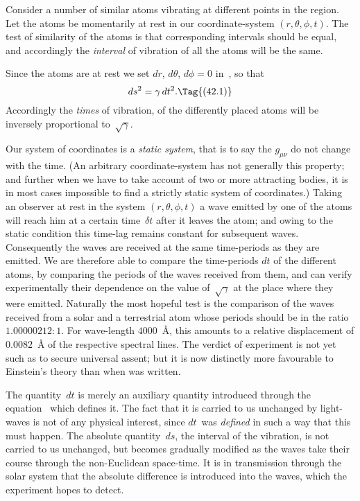 \documentclass[12pt]{book}
\begin{document}
%
%
%
%

Consider a number of similar atoms vibrating at different points in the
region. Let the atoms be momentarily at rest in our coordinate-system
$(r, \theta, \phi, t)$. The test of similarity of the atoms is that corresponding intervals
should be equal, and accordingly the \emph{interval} of vibration of all the atoms will
%
be the same.

Since the atoms are at rest we set $dr$, $d\theta$, $d\phi = 0$ in~, so that
\[
ds^{2} = \gamma\, dt^{2}.
\Tag{(42.1)}
\]
Accordingly the \emph{times} of vibration, of the differently placed atoms will be
inversely proportional to~$\sqrt{\gamma}$.

Our system of coordinates is a \emph{static system}, that is to say the $g_{\mu\nu}$ do not
change with the time. (An arbitrary coordinate-system has not generally this
property; and further when we have to take account of two or more attracting
bodies, it is in most cases impossible to find a strictly static system of coordinates.)
Taking an observer at rest in the system $(r, \theta, \phi, t)$ a wave emitted
by one of the atoms will reach him at a certain time~$\delta t$ after it leaves the
atom; and owing to the static condition this time-lag remains constant for
subsequent waves. Consequently the waves are received at the same time-periods
as they are emitted. We are therefore able to compare the time-periods
$dt$ of the different atoms, by comparing the periods of the waves received from
them, and can verify experimentally their dependence on the value of~$\sqrt{\gamma}$ at
the place where they were emitted. Naturally the most hopeful test is the
comparison of the waves received from a solar and a terrestrial atom whose
periods should be in the ratio $1.00000212 : 1$. For wave-length $4000$~Å, this
amounts to a relative displacement of $0.0082$~Å of the respective spectral
lines. The verdict of experiment is not yet such as to secure universal assent;
but it is now distinctly more favourable to Einstein's theory than when  was written.

The quantity~$dt$ is merely an auxiliary quantity introduced through the
equation~ which defines it. The fact that it is carried to us unchanged
by light-waves is not of any physical interest, since $dt$~was \emph{defined} in such a
way that this must happen. The absolute quantity~$ds$, the interval of the
vibration, is not carried to us unchanged, but becomes gradually modified as
the waves take their course through the non-Euclidean space-time. It is in
transmission through the solar system that the absolute difference is introduced
into the waves, which the experiment hopes to detect.
\end{document}
